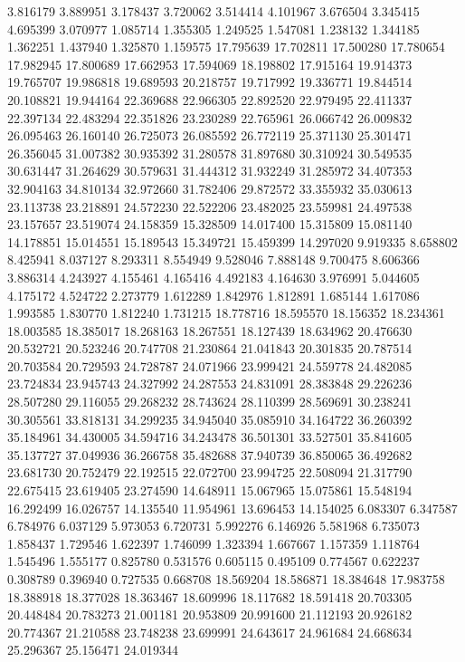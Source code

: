 3.816179
3.889951
3.178437
3.720062
3.514414
4.101967
3.676504
3.345415
4.695399
3.070977
1.085714
1.355305
1.249525
1.547081
1.238132
1.344185
1.362251
1.437940
1.325870
1.159575
17.795639
17.702811
17.500280
17.780654
17.982945
17.800689
17.662953
17.594069
18.198802
17.915164
19.914373
19.765707
19.986818
19.689593
20.218757
19.717992
19.336771
19.844514
20.108821
19.944164
22.369688
22.966305
22.892520
22.979495
22.411337
22.397134
22.483294
22.351826
23.230289
22.765961
26.066742
26.009832
26.095463
26.160140
26.725073
26.085592
26.772119
25.371130
25.301471
26.356045
31.007382
30.935392
31.280578
31.897680
30.310924
30.549535
30.631447
31.264629
30.579631
31.444312
31.932249
31.285972
34.407353
32.904163
34.810134
32.972660
31.782406
29.872572
33.355932
35.030613
23.113738
23.218891
24.572230
22.522206
23.482025
23.559981
24.497538
23.157657
23.519074
24.158359
15.328509
14.017400
15.315809
15.081140
14.178851
15.014551
15.189543
15.349721
15.459399
14.297020
9.919335
8.658802
8.425941
8.037127
8.293311
8.554949
9.528046
7.888148
9.700475
8.606366
3.886314
4.243927
4.155461
4.165416
4.492183
4.164630
3.976991
5.044605
4.175172
4.524722
2.273779
1.612289
1.842976
1.812891
1.685144
1.617086
1.993585
1.830770
1.812240
1.731215
18.778716
18.595570
18.156352
18.234361
18.003585
18.385017
18.268163
18.267551
18.127439
18.634962
20.476630
20.532721
20.523246
20.747708
21.230864
21.041843
20.301835
20.787514
20.703584
20.729593
24.728787
24.071966
23.999421
24.559778
24.482085
23.724834
23.945743
24.327992
24.287553
24.831091
28.383848
29.226236
28.507280
29.116055
29.268232
28.743624
28.110399
28.569691
30.238241
30.305561
33.818131
34.299235
34.945040
35.085910
34.164722
36.260392
35.184961
34.430005
34.594716
34.243478
36.501301
33.527501
35.841605
35.137727
37.049936
36.266758
35.482688
37.940739
36.850065
36.492682
23.681730
20.752479
22.192515
22.072700
23.994725
22.508094
21.317790
22.675415
23.619405
23.274590
14.648911
15.067965
15.075861
15.548194
16.292499
16.026757
14.135540
11.954961
13.696453
14.154025
6.083307
6.347587
6.784976
6.037129
5.973053
6.720731
5.992276
6.146926
5.581968
6.735073
1.858437
1.729546
1.622397
1.746099
1.323394
1.667667
1.157359
1.118764
1.545496
1.555177
0.825780
0.531576
0.605115
0.495109
0.774567
0.622237
0.308789
0.396940
0.727535
0.668708
18.569204
18.586871
18.384648
17.983758
18.388918
18.377028
18.363467
18.609996
18.117682
18.591418
20.703305
20.448484
20.783273
21.001181
20.953809
20.991600
21.112193
20.926182
20.774367
21.210588
23.748238
23.699991
24.643617
24.961684
24.668634
25.296367
25.156471
24.019344
